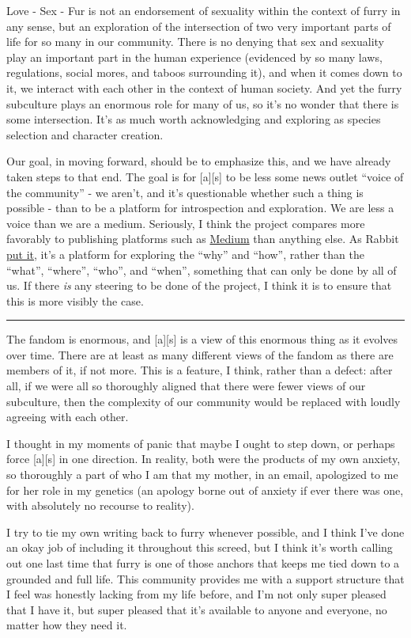 Love - Sex - Fur is not an endorsement of sexuality within the context
of furry in any sense, but an exploration of the intersection of two
very important parts of life for so many in our community. There is no
denying that sex and sexuality play an important part in the human
experience (evidenced by so many laws, regulations, social mores, and
taboos surrounding it), and when it comes down to it, we interact with
each other in the context of human society. And yet the furry subculture
plays an enormous role for many of us, so it's no wonder that there is
some intersection. It's as much worth acknowledging and exploring as
species selection and character creation.

Our goal, in moving forward, should be to emphasize this, and we have
already taken steps to that end. The goal is for {[}a{]}{[}s{]} to be
less some news outlet ``voice of the community'' - we aren't, and it's
questionable whether such a thing is possible - than to be a platform
for introspection and exploration. We are less a voice than we are a
medium. Seriously, I think the project compares more favorably to
publishing platforms such as \href{http://medium.com}{Medium} than
anything else. As Rabbit
\href{http://adjectivespecies.com/2014/01/24/when-youve-said-too-much/}{put
it}, it's a platform for exploring the ``why'' and ``how'', rather than
the ``what'', ``where'', ``who'', and ``when'', something that can only
be done by all of us. If there \emph{is} any steering to be done of the
project, I think it is to ensure that this is more visibly the case.

\begin{center}\rule{0.5\linewidth}{\linethickness}\end{center}

The fandom is enormous, and {[}a{]}{[}s{]} is a view of this enormous
thing as it evolves over time. There are at least as many different
views of the fandom as there are members of it, if not more. This is a
feature, I think, rather than a defect: after all, if we were all so
thoroughly aligned that there were fewer views of our subculture, then
the complexity of our community would be replaced with loudly agreeing
with each other.

I thought in my moments of panic that maybe I ought to step down, or
perhaps force {[}a{]}{[}s{]} in one direction. In reality, both were the
products of my own anxiety, so thoroughly a part of who I am that my
mother, in an email, apologized to me for her role in my genetics (an
apology borne out of anxiety if ever there was one, with absolutely no
recourse to reality).

I try to tie my own writing back to furry whenever possible, and I think
I've done an okay job of including it throughout this screed, but I
think it's worth calling out one last time that furry is one of those
anchors that keeps me tied down to a grounded and full life. This
community provides me with a support structure that I feel was honestly
lacking from my life before, and I'm not only super pleased that I have
it, but super pleased that it's available to anyone and everyone, no
matter how they need it.
